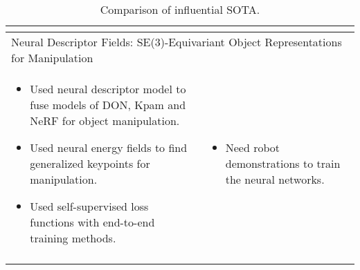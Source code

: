 \begin{longtable}{|p{7cm}|p{7cm}|}
\begin{itemize}
                                                                                        \end{itemize}                                                             \\ \hline
    \multicolumn{2}{m{14cm}}{\centering Neural Descriptor Fields: SE(3)-Equivariant Object Representations for Manipulation\cite{ndfs}}                                                                                         \\ \hline
    \begin{itemize}
        \itemsep0em
        \item Used neural descriptor model to fuse models of \ac{DON}, Kpam\cite{kpam} and \ac{NeRF} for object manipulation.
        \item Used neural energy fields to find generalized keypoints for manipulation.
        \item Used self-supervised loss functions with end-to-end training methods.
    \end{itemize}                                                    & \begin{itemize}
                                                                           \itemsep0em
                                                                           \item Need robot demonstrations to train the neural networks.
                                                                       \end{itemize}                                                                                             \\ \hline
    \caption{Comparison of influential \ac{SOTA}.}
\end{longtable}